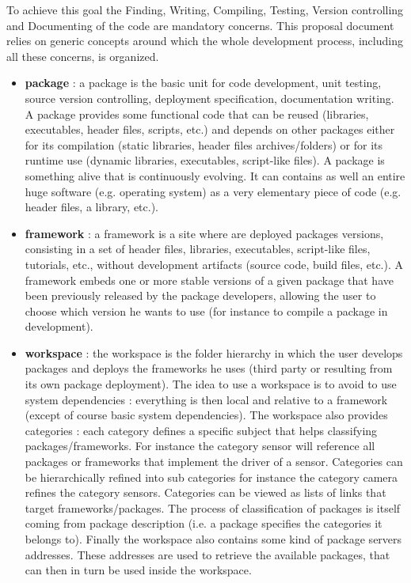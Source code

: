 \documentclass[12pt,a4paper]{article}
\begin{document}
To achieve this goal the Finding, Writing, Compiling, Testing, Version controlling and Documenting of the code are mandatory concerns. This proposal document relies on generic concepts around which the whole development process, including all these concerns, is organized.

\begin{itemize}
\item \textbf{package} : a package is the basic unit for code development, unit testing, source version controlling, deployment specification, documentation writing. A package provides some functional code that can be reused (libraries, executables, header files, scripts, etc.) and depends on other packages either for its compilation (static libraries, header files archives/folders) or for its runtime use (dynamic libraries, executables, script-like files). A package is something alive that is continuously evolving. It can contains as well an entire huge software (e.g. operating system) as a very elementary piece of code (e.g. header files, a library, etc.).
\item \textbf{framework} :  a framework is a site where are deployed packages versions, consisting in a set of header files, libraries, executables, script-like files, tutorials, etc., without development artifacts (source code, build files, etc.). A framework embeds one or more stable versions of a given package that have been previously released by the package developers, allowing the user to choose which version he wants to use (for instance to compile a package in development).
\item \textbf{workspace }:  the workspace is the folder hierarchy in which the user develops packages and deploys the frameworks he uses (third party or resulting from its own package deployment). The idea to use a workspace is to avoid to use system dependencies : everything is then local and relative to a framework (except of course basic system dependencies). The workspace also provides categories : each category defines a specific subject that helps classifying packages/frameworks. For instance the category sensor will reference all packages or frameworks that implement the driver of a sensor. Categories can be hierarchically refined into sub categories for instance the category camera refines the category sensors. Categories can be viewed as lists of links that target frameworks/packages. The process of classification of packages is itself coming from package description (i.e. a package specifies the categories it belongs to). Finally the workspace also contains some kind of package servers addresses. These addresses are used to retrieve the available packages, that can then in turn be used inside the workspace.

\end{itemize}
\end{document}
